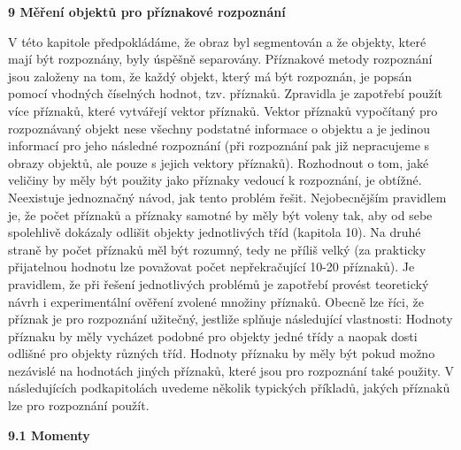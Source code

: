 
\noindent \textbf{9  Měření objektů pro příznakové rozpoznání}

\noindent V této kapitole předpokládáme, že obraz byl segmentován a že objekty, které mají být rozpoznány, byly úspěšně separovány. Příznakové metody rozpoznání jsou založeny na tom, že každý objekt, který má být rozpoznán, je popsán pomocí vhodných číselných hodnot, tzv. příznaků. Zpravidla je zapotřebí použít více příznaků, které vytvářejí vektor příznaků. Vektor příznaků vypočítaný pro rozpoznávaný objekt nese všechny podstatné informace o objektu a je jedinou informací pro jeho následné rozpoznání (při rozpoznání pak již nepracujeme s obrazy objektů, ale pouze s jejich vektory příznaků). Rozhodnout o tom, jaké veličiny by měly být použity jako příznaky vedoucí k rozpoznání, je obtížné. Neexistuje jednoznačný návod, jak tento problém řešit. Nejobecnějším pravidlem je, že počet příznaků a příznaky samotné by měly být voleny tak, aby od sebe spolehlivě dokázaly odlišit objekty jednotlivých tříd (kapitola 10). Na druhé straně by počet příznaků měl být rozumný, tedy ne příliš velký (za prakticky přijatelnou hodnotu lze považovat počet nepřekračující 10-20 příznaků). Je pravidlem, že při řešení jednotlivých problémů je zapotřebí provést teoretický návrh i experimentální ověření zvolené množiny příznaků. Obecně lze říci, že příznak je pro rozpoznání užitečný, jestliže splňuje následující vlastnosti: Hodnoty příznaku by měly vycházet podobné pro objekty jedné třídy a naopak dosti odlišné pro objekty různých tříd. Hodnoty příznaku by měly být pokud možno nezávislé na hodnotách jiných příznaků, které jsou pro rozpoznání také použity. V následujících podkapitolách uvedeme několik typických příkladů, jakých příznaků lze pro rozpoznání použít.

\noindent \textbf{9.1 Momenty}

